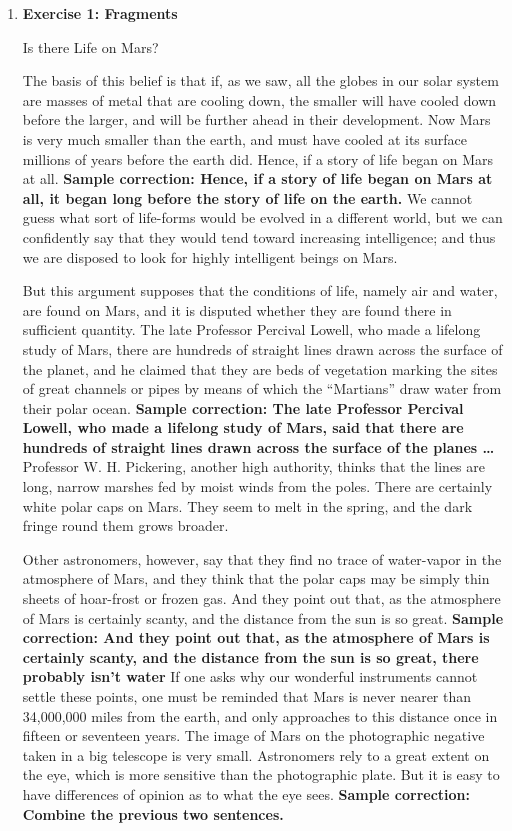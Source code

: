\begin{enumerate}
\begin{itemize}
\begin{enumerate}
\item \textbf{Exercise 1: Fragments}

Is there Life on Mars?

The basis of this belief is that if, as we saw, all the globes in our solar system are masses of metal that are cooling down, the smaller will have cooled down before the larger, and will be further ahead in their development. Now Mars is very much smaller than the earth, and must have cooled at its surface millions of years before the earth did. Hence, if a story of life began on Mars at all. \textbf{Sample correction: Hence, if a story of life began on Mars at all, it began long before the story of life on the earth.} We cannot guess what sort of life-forms would be evolved in a different world, but we can confidently say that they would tend toward increasing intelligence; and thus we are disposed to look for highly intelligent beings on Mars.

But this argument supposes that the conditions of life, namely air and water, are found on Mars, and it is disputed whether they are found there in sufficient quantity. The late Professor Percival Lowell, who made a lifelong study of Mars, there are hundreds of straight lines drawn across the surface of the planet, and he claimed that they are beds of vegetation marking the sites of great channels or pipes by means of which the ``Martians'' draw water from their polar ocean. \textbf{Sample correction: The late Professor Percival Lowell, who made a lifelong study of Mars, said that there are hundreds of straight lines drawn across the surface of the planes \ldots} Professor W. H. Pickering, another high authority, thinks that the lines are long, narrow marshes fed by moist winds from the poles. There are certainly white polar caps on Mars. They seem to melt in the spring, and the dark fringe round them grows broader.

Other astronomers, however, say that they find no trace of water-vapor in the atmosphere of Mars, and they think that the polar caps may be simply thin sheets of hoar-frost or frozen gas. And they point out that, as the atmosphere of Mars is certainly scanty, and the distance from the sun is so great. \textbf{Sample correction: And they point out that, as the atmosphere of Mars is certainly scanty, and the distance from the sun is so great, there probably isn't water} If one asks why our wonderful instruments cannot settle these points, one must be reminded that Mars is never nearer than 34,000,000 miles from the earth, and only approaches to this distance once in fifteen or seventeen years. The image of Mars on the photographic negative taken in a big telescope is very small. Astronomers rely to a great extent on the eye, which is more sensitive than the photographic plate. But it is easy to have differences of opinion as to what the eye sees. \textbf{Sample correction: Combine the previous two sentences.}


\end{enumerate}
\end{itemize}
\end{enumerate}

